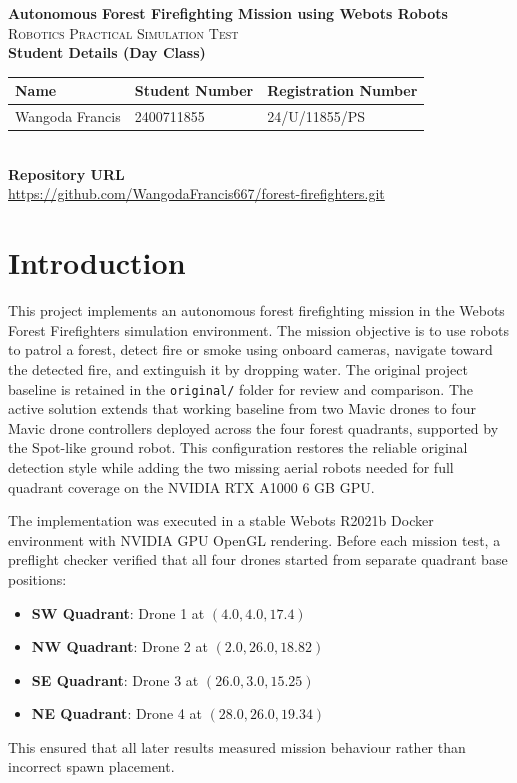 \documentclass[10pt,a4paper]{article}
\begin{document}
\begin{center}
    {\Large \textbf{\textcolor{primary}{Autonomous Forest Firefighting Mission using Webots Robots}}}\\[6pt]
    {\large \textsc{Robotics Practical Simulation Test}}\\[16pt]

    \textbf{Student Details (Day Class)}\\[6pt]
    \begin{tabular}{@{} l l l @{}}
    \toprule
    \textbf{Name} & \textbf{Student Number} & \textbf{Registration Number} \\
    \midrule
    Wangoda Francis & 2400711855 & 24/U/11855/PS \\
    \bottomrule
    \end{tabular}\\[16pt]
    \textbf{Repository URL}\\[6pt]
    \url{https://github.com/WangodaFrancis667/forest-firefighters.git}
\end{center}

\vspace{-0.4em}

\section{Introduction}
This project implements an autonomous forest firefighting mission in the Webots Forest Firefighters simulation environment. The mission objective is to use robots to patrol a forest, detect fire or smoke using onboard cameras, navigate toward the detected fire, and extinguish it by dropping water. The original project baseline is retained in the \texttt{original/} folder for review and comparison. The active solution extends that working baseline from two Mavic drones to four Mavic drone controllers deployed across the four forest quadrants, supported by the Spot-like ground robot. This configuration restores the reliable original detection style while adding the two missing aerial robots needed for full quadrant coverage on the NVIDIA RTX A1000 6 GB GPU.

The implementation was executed in a stable Webots R2021b Docker environment with NVIDIA GPU OpenGL rendering. Before each mission test, a preflight checker verified that all four drones started from separate quadrant base positions:
\begin{itemize}
    \item \textbf{SW Quadrant}: Drone 1 at $(4.0, 4.0, 17.4)$
    \item \textbf{NW Quadrant}: Drone 2 at $(2.0, 26.0, 18.82)$
    \item \textbf{SE Quadrant}: Drone 3 at $(26.0, 3.0, 15.25)$
    \item \textbf{NE Quadrant}: Drone 4 at $(28.0, 26.0, 19.34)$
\end{itemize}
This ensured that all later results measured mission behaviour rather than incorrect spawn placement.
\end{document}
